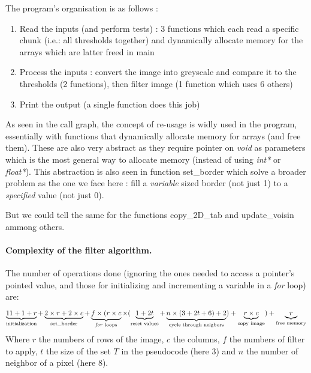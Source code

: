 \documentclass[a4paper]{report} %
\begin{document}
\SetEndCharOfAlgoLine{}

The program's organisation is as follows :
\begin{enumerate}
\item Read the inputs (and perform tests) : 3 functions which each read a specific chunk (i.e.: all thresholds together) and dynamically allocate memory for the arrays which are latter freed in main

\item Process the inputs : convert the image into greyscale and compare it to the thresholds (2 functions), then filter image (1 function which uses 6 others)

\item Print the output (a single function does this job)
\end{enumerate}

As seen in the call graph, the concept of re-usage is widly used in the program, essentially with functions that dynamically allocate memory for arrays (and free them).
These are also very abstract as they require pointer on \emph{void} as parameters which is the most general way to allocate memory (instead of using \emph{int*} or \emph{float*}).
This abstraction is also seen in function set\_border which solve a broader problem as the one we face here : fill a \emph{variable} sized border (not just 1) to a \emph{specified} value (not just 0).

But we could tell the same for the functions copy\_2D\_tab and update\_voisin ammong others.

\paragraph{Complexity of the filter algorithm.} The number of operations done (ignoring the ones needed to access a pointer's pointed value, and those for initializing and incrementing a variable in a \emph{for} loop) are:
\[
\underbrace{11 + 1 + r }_{\text{initialization}}
+
\underbrace{2 \times r + 2 \times c }_{\text{set\_border}} 
+
\underbrace{ f \times ( r \times c }_{\text{\emph{for} loops}}
\times ( 
\underbrace{1+2t}_{\text{reset values}}
+ 
\underbrace{n \times (3 + 2t + 6) + 2}_{\text{cycle through neigbors}}
) + 
\underbrace{ r \times c }_{\text{copy image}}
)+ 
\underbrace{ r }_{\text{free memory}}
\]
Where $r$ the numbers of rows of the image, $c$ the columns, $f$ the numbers of filter to apply, $t$ the size of the set $T$ in the pseudocode (here $3$) and $n$ the number of neighbor of a pixel (here $8$).
\end{document}
